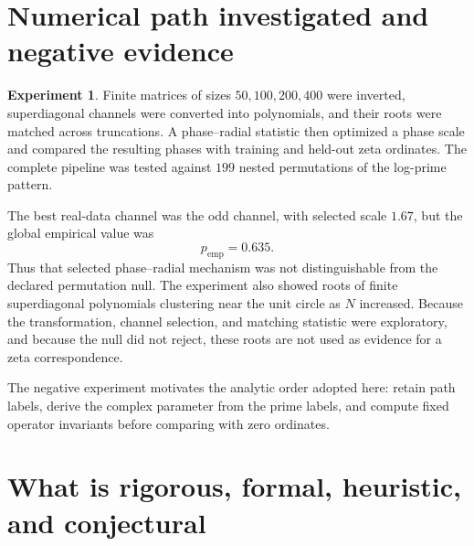 \documentclass[11pt]{amsart}
\numberwithin{equation}{section}
\theoremstyle{plain}
\theoremstyle{definition}
\newtheorem{experiment}[theorem]{Experiment}
\theoremstyle{remark}
\begin{document}
\section{Numerical path investigated and negative evidence}
\label{sec:numerical_negative}

\begin{experiment}
\label{exp:phase_radial}
Finite matrices of sizes $50,100,200,400$ were inverted, superdiagonal channels were converted into polynomials, and their roots were matched across truncations.  A phase--radial statistic then optimized a phase scale and compared the resulting phases with training and held-out zeta ordinates.  The complete pipeline was tested against $199$ nested permutations of the log-prime pattern.
\end{experiment}

The best real-data channel was the odd channel, with selected scale $1.67$, but the global empirical value was
\begin{equation}
p_{\mathrm{emp}}=0.635.
\label{eq:phase_radial_pvalue}
\end{equation}
Thus that selected phase--radial mechanism was not distinguishable from the declared permutation null.  The experiment also showed roots of finite superdiagonal polynomials clustering near the unit circle as $N$ increased.  Because the transformation, channel selection, and matching statistic were exploratory, and because the null did not reject, these roots are not used as evidence for a zeta correspondence.

The negative experiment motivates the analytic order adopted here: retain path labels, derive the complex parameter from the prime labels, and compute fixed operator invariants before comparing with zero ordinates.

\section{What is rigorous, formal, heuristic, and conjectural}
\label{sec:status}
\end{document}
